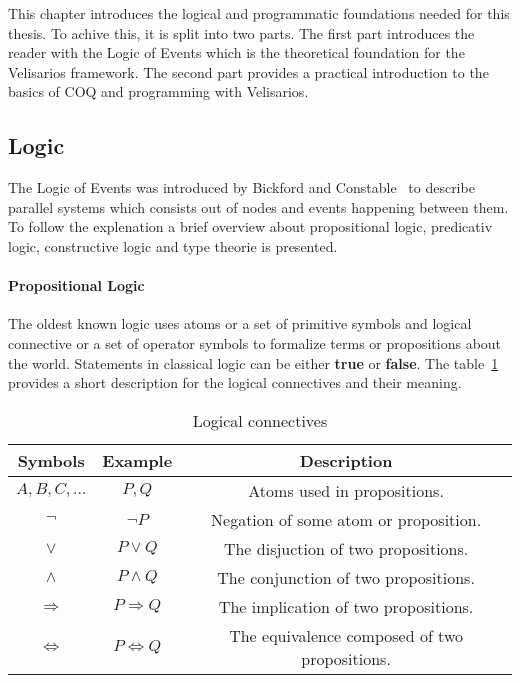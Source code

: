


This chapter introduces the logical and programmatic foundations needed for this
thesis. To achive this, it is split into two parts. The first part introduces
the reader with the Logic of Events which is the theoretical foundation for the
Velisarios framework. The second part provides a practical introduction to
the basics of COQ and programming with Velisarios.

\subsection{Logic}

The Logic of Events was introduced by Bickford and
Constable~\cite{bickford2003logic} to describe parallel systems which
consists out of nodes and events happening between them. To follow
the explenation a brief overview about propositional logic, predicativ logic,
constructive logic and type theorie is presented.

\paragraph{Propositional Logic}
The oldest known logic uses atoms or a set of primitive symbols and logical
connective or a set of operator symbols to formalize
terms or propositions about the world. Statements in classical logic can be either
\textbf{true} or \textbf{false}. The table~\ref{tab:proplogic} provides
a short description for the logical connectives and their meaning.~\cite{heinemann2013logik}

\begin{table}[h]
  \centering
  \begin{tabular}{c|c|c}
    Symbols & Example & Description\\\hline
    $A,B,C,...$ & $P, Q$ & Atoms used in propositions.\\
    $\neg$ & $\neg P$ & Negation of some atom or proposition.\\
    $\vee$ & $P \vee Q$ & The disjuction of two propositions.\\
    $\wedge$ & $P \wedge Q$ & The conjunction of two propositions.\\
    $\Rightarrow$ & $P \Rightarrow Q$ & The implication of two propositions.\\
    $\Leftrightarrow$ & $P \Leftrightarrow Q$ & The equivalence composed of two propositions.\\
  \end{tabular}
  \caption{Logical connectives}
  \label{tab:proplogic}
\end{table}

